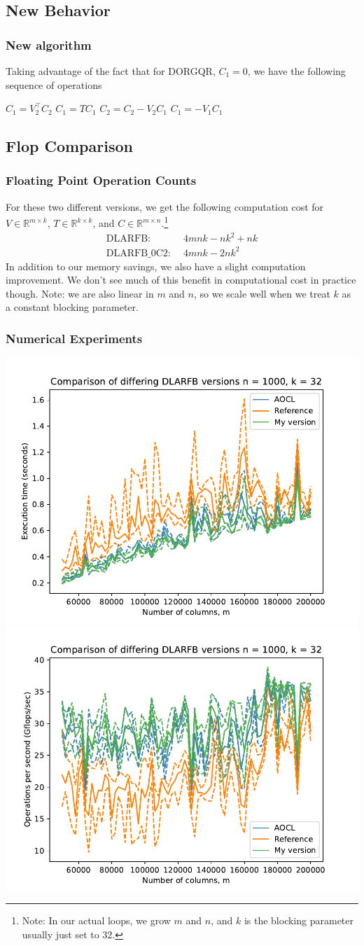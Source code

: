 \documentclass[12pt,aspectratio=169]{beamer}
\newcommand{\R}{\mathbb{R}}
\begin{document}
    \subsection{New Behavior}
    \begin{frame}
        \frametitle{New algorithm}
        Taking advantage of the fact that for DORGQR, $C_1 = 0$, we have the following sequence of operations
        \begin{algorithmic}[1]
            \State $C_1 = V_2^\top C_2$
            \State $C_1 = TC_1$
            \State $C_2 = C_2 - V_2C_1$
            \State $C_1 =     - V_1C_1$
        \end{algorithmic}
    \end{frame}
    \subsection{Flop Comparison}
    \begin{frame}
        \frametitle{Floating Point Operation Counts}
        For these two different versions, we get the following computation cost for $V\in\R^{m\times k}$, $T\in\R^{k\times k}$, and $C\in\R^{m\times n}$.\footnote{Note: In our actual loops, we grow $m$ and $n$, and $k$ is the blocking parameter usually just set to $32$.}
        \begin{align*}
            \text{DLARFB: }&\, 4mnk - nk^2 + nk\\
            \text{DLARFB\_0C2: }&\, 4mnk - 2nk^2
        \end{align*}
        In addition to our memory savings, we also have a slight computation improvement. We don't see
        much of this benefit in computational cost in practice though. Note: we are also linear in $m$ and
        $n$, so we scale well when we treat $k$ as a constant blocking parameter.
    \end{frame}
    \begin{frame}
        \frametitle{Numerical Experiments}
        \begin{center}
        \includegraphics[width=.45\textwidth]{figures/timeDLARFB.pdf}
        \includegraphics[width=.45\textwidth]{figures/flopDLARFB.pdf}
        \end{center}
    \end{frame}
\end{document}
